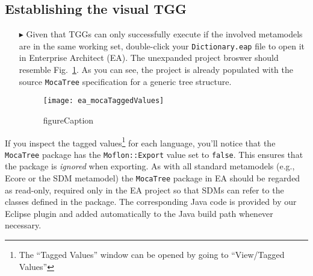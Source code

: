 \newpage
\hypertarget{initialize vis}{}
\subsection{Establishing the visual TGG}
\visHeader

\begin{itemize}

\item[$\blacktriangleright$] Given that TGGs can only successfully execute if the involved metamodels are in the same working set, double-click your
\texttt{Dict\-ion\-ary.eap} file to open it in Enterprise Architect (EA). The unexpanded project broswer should resemble Fig.~\ref{ea:mocaTagged}.
As you can see, the project is already populated with the source \texttt{MocaTree} specification for a generic tree structure.

\begin{figure}[htpb]
\begin{center}
  \texttt{[image: ea\_mocaTaggedValues]}
  \caption{figureCaption}
  \label{ea:mocaTagged}
\end{center}
\end{figure}

\end{itemize}

If you inspect the tagged values\footnote{The ``Tagged Values'' window can be opened by going to ``View/Tagged Values''} for each language, you'll notice that
the \texttt{MocaTree} package has the \texttt{Moflon::Export} value set to \texttt{false}. This ensures that the package is \emph{ignored} when exporting. As
with all standard metamodels (e.g., Ecore or the SDM metamodel) the \texttt{MocaTree} package in EA should be regarded as read-only, required only in the
EA project so that SDMs can refer to the classes defined in the package. The corresponding Java code is provided by our Eclipse plugin and added automatically
to the Java build path whenever necessary.

